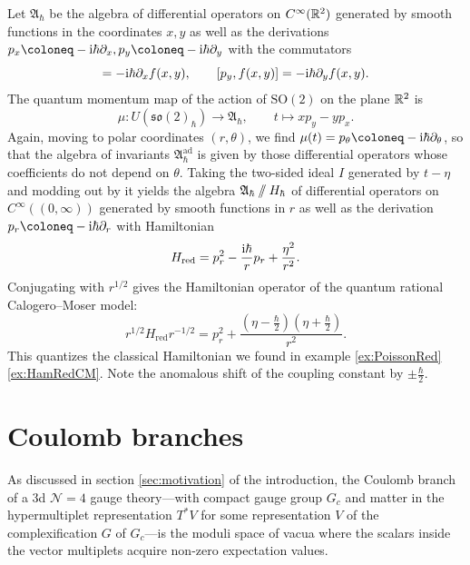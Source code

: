 \begin{example}
	Let $\mathfrak{A}_\hbar$ be the algebra of differential operators on $C^\infty(\mathbb{R}^2)$ generated by smooth functions in the coordinates $x,y$ as well as the derivations $p_x \coloneq -\I\hbar \partial_x,p_y \coloneq -\I\hbar \partial_y$ with the commutators
	\begin{equation}
		[p_x,f(x,y)] = -\I\hbar \partial_x f(x,y), \qquad [p_y,f(x,y)] = -\I\hbar \partial_y f(x,y).
	\end{equation}		
	The quantum momentum map of the action of $\mathrm{SO}(2)$ on the plane $\mathbb{R}^2$ is
	\begin{equation}
		\mu\colon U(\mathfrak{so}(2)_\hbar) \to \mathfrak{A}_\hbar, \qquad t \mapsto x p_y - y p_x.
	\end{equation}
	Again, moving to polar coordinates $(r,\theta)$, we find $\mu(t) = p_\theta \coloneq -\I\hbar \partial_\theta$, so that the algebra of invariants $\mathfrak{A}_\hbar^{\operatorname{ad}}$ is given by those differential operators whose coefficients do not depend on $\theta$. Taking the two-sided ideal $I$ generated by $t - \eta$ and modding out by it yields the algebra $\mathfrak{A}_\hbar \mathbin{/\!\!/} H_\hbar$ of differential operators on $C^\infty((0,\infty))$ generated by smooth functions in $r$ as well as the derivation $p_r \coloneq -\I\hbar \partial_r$ with Hamiltonian
	\begin{equation}
		H_\text{red} = p_r^2 - \frac{\mathrm{i}\hbar}{r} p_r + \frac{\eta^2}{r^2}.
	\end{equation}
	Conjugating with $r^{1/2}$ gives the Hamiltonian operator of the quantum rational Calogero--Moser model:
	\begin{equation}
		r^{1/2} H_\text{red} r^{-1/2} = p_r^2 + \frac{(\eta-\frac{\hbar}{2})(\eta+\frac{\hbar}{2})}{r^2}.
	\end{equation}
	This quantizes the classical Hamiltonian we found in example \ref{ex:PoissonRed} \ref{ex:HamRedCM}. Note the anomalous shift of the coupling constant by $\pm\frac{\hbar}{2}$.
\end{example}

\section{Coulomb branches}\label{sec:CB}

As discussed in section \ref{sec:motivation} of the introduction, the Coulomb branch of a 3d $\mathcal{N}=4$ gauge theory---with compact gauge group $G_c$ and matter in the hypermultiplet representation $T^* V$ for some representation $V$ of the complexification $G$ of $G_c$---is the moduli space of vacua where the scalars inside the vector multiplets acquire non-zero expectation values.

